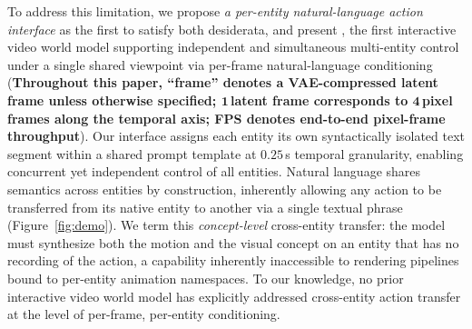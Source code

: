 To address this limitation,
we propose \emph{a per-entity natural-language action interface} as the 
first to 
satisfy both desiderata, and present \methodname, 
the first interactive video world model 
supporting 
independent and simultaneous multi-entity control 
under a single shared viewpoint via 
per-frame natural-language conditioning
(\textbf{Throughout this paper, ``frame'' denotes a VAE-compressed latent frame 
unless otherwise specified; $\mathbf{1}$\,latent frame corresponds to $\mathbf{4}$\,pixel 
frames along the temporal axis; FPS denotes end-to-end pixel-frame throughput}).
Our interface assigns each entity its own 
syntactically isolated text segment within 
a shared prompt template at $0.25$\,s temporal 
granularity, enabling concurrent yet 
independent control of all entities.
Natural language shares semantics across entities by construction,
inherently allowing any action to be transferred from its 
native entity to another via a single textual phrase (Figure~\ref{fig:demo}).
We term this \emph{concept-level} cross-entity transfer: the model must 
synthesize both 
the motion and the visual concept on an entity that has no recording of the 
action, a capability inherently inaccessible to 
rendering pipelines bound to per-entity animation namespaces.
To our knowledge, no prior interactive video world model has explicitly addressed 
cross-entity action transfer at the level of per-frame, 
per-entity conditioning.

